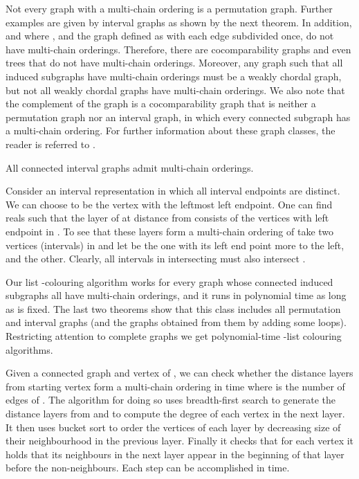 \documentclass[12pt]{llncs}
\begin{document}
Not every graph with a multi-chain ordering is a
permutation graph. Further examples are given by interval graphs as shown by
the next theorem. 
In addition,  and  where , and the graph  defined as  with each edge subdivided once, do not have multi-chain orderings.
Therefore, there are cocomparability graphs and even trees that do not have multi-chain orderings. Moreover, any graph such that all induced subgraphs have multi-chain orderings must be a weakly chordal graph, but not all weakly chordal graphs have multi-chain orderings. We also note that the complement of the graph  is a cocomparability graph that is neither a permutation graph nor an interval graph, in which every connected subgraph has a multi-chain ordering. For further information about these graph classes, the reader is referred to \cite{BLS}.


\begin{theorem}\label{inter}
All connected interval graphs admit multi-chain orderings.
\end{theorem}

\begin{my_proof}
Consider an interval representation in which all interval endpoints are distinct.
We can choose  to be the vertex with the leftmost left endpoint.
One can find reals  such that the layer  of  at
distance  from  consists of the vertices with left endpoint
in . To see that these layers form  a multi-chain
ordering of  take two vertices (intervals) in  and let  be the one with
its left end point more to the left, and  the other. Clearly, all
intervals in  intersecting  must also intersect .
\end{my_proof}

Our list -colouring algorithm works for every graph whose
connected induced subgraphs all have multi-chain orderings, and it runs in
polynomial time as long as  is fixed. The last two theorems show that
this class includes all permutation and interval graphs (and the graphs
obtained from them by adding some loops). Restricting attention to complete
graphs  we get polynomial-time -list colouring algorithms. 


Given a connected graph  and vertex  of ,
we can check whether the distance layers from starting vertex 
form a multi-chain ordering in  time where  is the number of edges
of .
The algorithm for doing so uses breadth-first search to
generate the distance layers from  and to compute the degree
of each vertex in the next layer.
It then uses bucket sort to order the vertices of each layer
by decreasing size of their neighbourhood in the previous layer.  
Finally it checks that for each vertex it holds that its neighbours in the
next layer appear in the beginning of that layer before the
non-neighbours. Each step can be accomplished in  time. 
\end{document}
